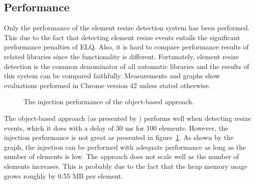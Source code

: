 \documentclass{llncs}
\newcommand{\elq}{ELQ}
\begin{document}
  \subsection{Performance}\label{sec:eval-perf}
    Only the performance of the element resize detection system has been performed.
    This due to the fact that detecting element resize events entails the significant performance penalties of \elq{}.
    Also, it is hard to compare performance results of related libraries since the functionality is different.
    Fortunately, element resize detection is the common denominator of all automatic libraries and the results of this system can be compared faithfully.
    Measurements and graphs show evaluations performed in Chrome version 42 unless stated otherwise.
    \begin{figure}[h]
      \tiny
      \begin{center}
        \begin{minipage}[t]{.5\textwidth}
          \vspace{0pt}
          \centering
        \end{minipage}%
      \caption{The injection performance of the object-based approach.}
      \label{fig:erd-original-object}
      \end{center}
    \end{figure}
    \newline\indent
    The object-based approach (as presented by \cite{backalley}) performs well when detecting resize events, which it does with a delay of 30 ms for 100 elements.
    However, the injection performance is not great as presented in figure~\ref{fig:erd-original-object}.
    As shown by the graph, the injection can be performed with adequate performance as long as the number of elements is low.
    The approach does not scale well as the number of elements increases.
    This is probably due to the fact that the heap memory usage grows roughly by 0.55 MB per element.
\end{document}
